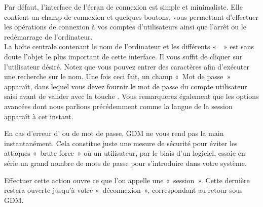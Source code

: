 Par défaut, l'interface de l'écran de connexion est simple et minimaliste. Elle contient un champ de connexion et quelques boutons, vous permettant d'effectuer les opérations de connexion à vos comptes d'utilisateurs ainsi que l'arrêt ou le redémarrage de l'ordinateur.\\ 
La boîte centrale contenant le nom de l'ordinateur et les différents «~~» est sans doute l'objet le plus important de cette interface. Il vous suffit de cliquer sur l'utilisateur désiré. Notez que vous pouvez entrer des caractères afin d'exécuter une recherche sur le nom. Une fois ceci fait, un champ «~Mot de passe~» apparaît, dans lequel vous devez fournir le mot de passe du compte utilisateur saisi avant de valider avec la touche . Vous remarquerez également que les options avancées dont nous parlions précédemment comme la langue de la session apparaît à cet instant.\par
\begin{nota}
En cas d'erreur d' ou de mot de passe, GDM ne vous rend pas la main instantanément. Cela constitue juste une mesure de sécurité pour éviter les attaques «~brute force~» où un utilisateur, par le biais d'un logiciel, essaie en série un grand nombre de mots de passe pour s'introduire dans votre système.
\end{nota}
Effectuer cette action ouvre ce que l'on appelle une «~session~». Cette dernière restera ouverte jusqu'à votre «~déconnexion~», correspondant au retour sous GDM.
